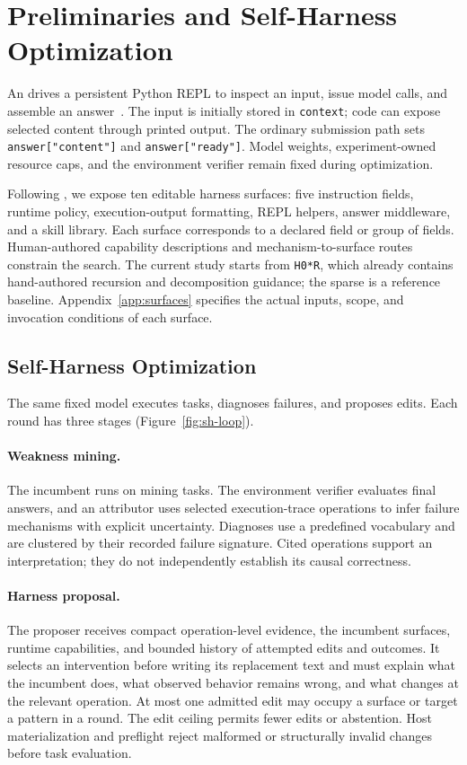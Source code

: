 \section{Preliminaries and Self-Harness Optimization}
\label{sec:method}

An \rlm{} drives a persistent Python REPL to inspect an input, issue model calls,
and assemble an answer~\citep{zhang2025rlm}. The input is initially stored in
\texttt{context}; code can expose selected content through printed output. The
ordinary submission path sets \texttt{answer["content"]} and
\texttt{answer["ready"]}. Model weights, experiment-owned resource caps, and
the environment verifier remain fixed during optimization.

Following \citet{zhang2026selfharness}, we expose ten editable harness surfaces:
five instruction fields, runtime policy, execution-output formatting, REPL
helpers, answer middleware, and a skill library. Each surface corresponds to a
declared field or group of fields. Human-authored capability descriptions and
mechanism-to-surface routes constrain the search. The current study starts from
\texttt{H0*R}, which already contains hand-authored recursion and decomposition
guidance; the sparse \hzero{} is a reference baseline. Appendix~\ref{app:surfaces}
specifies the actual inputs, scope, and invocation conditions of each surface.

\subsection{Self-Harness Optimization}
\label{sec:sho}

The same fixed model executes tasks, diagnoses failures, and proposes edits.
Each round has three stages (Figure~\ref{fig:sh-loop}).

\paragraph{Weakness mining.}
The incumbent runs on mining tasks. The environment verifier evaluates final
answers, and an attributor uses selected execution-trace operations to infer
failure mechanisms with explicit uncertainty. Diagnoses use a predefined
vocabulary and are clustered by their recorded failure signature. Cited
operations support an interpretation; they do not independently establish its
causal correctness.

\paragraph{Harness proposal.}
The proposer receives compact operation-level evidence, the incumbent surfaces,
runtime capabilities, and bounded history of attempted edits and outcomes. It
selects an intervention before writing its replacement text and must explain
what the incumbent does, what observed behavior remains wrong, and what changes
at the relevant operation. At most one admitted edit may occupy a surface or
target a pattern in a round. The edit ceiling permits fewer edits or abstention.
Host materialization and preflight reject malformed or structurally invalid
changes before task evaluation.

